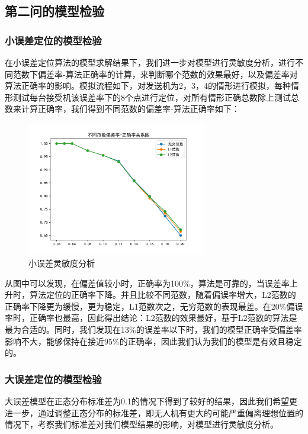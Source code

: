 \documentclass{my_paper}
\begin{document}
\subsection{第二问的模型检验}
\subsubsection{小误差定位的模型检验}
在小误差定位算法的模型求解结果下，我们进一步对模型进行灵敏度分析，进行不同范数下偏差率-算法正确率的计算，来判断哪个范数的效果最好，以及偏差率对算法正确率的影响。模拟流程如下，对发送机为2，3，4的情形进行模拟，每种情形测试每台接受机该误差率下的8个点进行定位，对所有情形正确总数除上测试总数来计算正确率，我们得到不同范数的偏差率-算法正确率如下：

\begin{figure}[H]
    \centering
    \includegraphics[width=0.7\textwidth]{check2}
    \caption{小误差灵敏度分析} 
\end{figure}

从图中可以发现，在偏差值较小时，正确率为100\%，算法是可靠的，当误差率上升时，算法定位的正确率下降。并且比较不同范数，随着偏误率增大，L2范数的正确率下降更为缓慢，更为稳定，L1范数次之，无穷范数的表现最差。在20\%偏误率时，正确率也最高，因此得出结论：L2范数的效果最好，基于L2范数的算法是最为合适的。同时，我们发现在13\%的误差率以下时，我们的模型正确率受偏差率影响不大，能够保持在接近95\%的正确率，因此我们认为我们的模型是有效且稳定的。
\subsubsection{大误差定位的模型检验}

大误差模型在正态分布标准差为0.1的情况下得到了较好的结果，因此我们希望更进一步，通过调整正态分布的标准差，即无人机有更大的可能严重偏离理想位置的情况下，考察我们标准差对我们模型结果的影响，对模型进行灵敏度分析。
\end{document}
